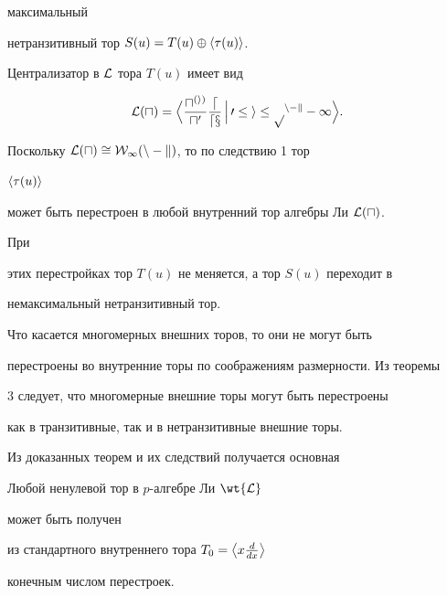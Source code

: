 максимальный 


нетранзитивный тор $S(u)=T(u)\oplus\langle\tau(u)\rangle$. 


 


Централизатор в $\cal L$ тора $T(u)$ имеет вид 


$$ 


\cal L(u)=\Big\la\frac{u^{(i)}}{u'}\frac{d}{dx}\,\Big|\, 


0\le i\le p^{n-k}-1\Big\ra. 


$$ 


Поскольку $\cal L(u)\cong W_1(n-k)$, то по следствию 1 тор 


$\langle\tau(u)\rangle$ 


может быть перестроен в любой внутренний тор алгебры Ли $\cal L(u)$. 


При 


этих перестройках тор $T(u)$ не меняется, а тор $S(u)$ переходит в 


немаксимальный нетранзитивный тор. 


 


Что касается многомерных внешних торов, то они не могут быть 


перестроены во внутренние торы по соображениям размерности. Из теоремы 


3 следует, что многомерные внешние торы могут быть перестроены 


как в транзитивные, так и в нетранзитивные внешние торы. 


 


Из доказанных теорем и их следствий получается основная 


 


\begin{thm} Любой ненулевой тор в $p$-алгебре Ли $\wt{\cal L}$ 


может быть получен 


из стандартного внутреннего тора $T_0=\big\langle x\frac{d}{dx}\big\rangle$ 


конечным числом перестроек. 


\end{thm} 


 


